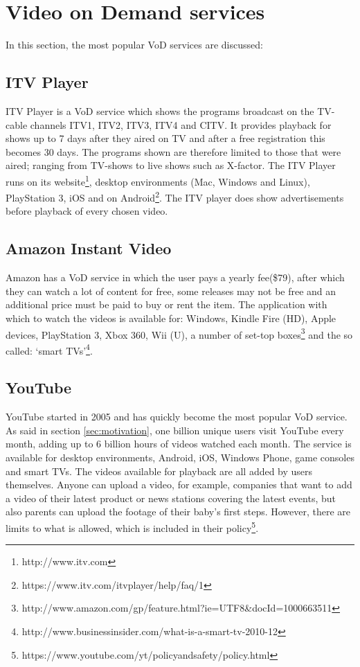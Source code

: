 \section{Video on Demand services}
\label{sec:vodserv}
In this section, the most popular VoD services are discussed:

\subsection{ITV Player}
ITV Player is a VoD service which shows the programs broadcast on the TV-cable channels ITV1, ITV2, ITV3, ITV4 and CITV. It provides playback for shows up to 7 days after they aired on TV and after a free registration this becomes 30 days. The programs shown are therefore limited to those that were aired; ranging from TV-shows to live shows such as X-factor. The ITV Player runs on its website\footnote{http://www.itv.com}, desktop environments (Mac, Windows and Linux), PlayStation 3, iOS and on Android\footnote{https://www.itv.com/itvplayer/help/faq/1}. The ITV player does show advertisements before playback of every chosen video.

\subsection{Amazon Instant Video}
Amazon has a VoD service in which the user pays a yearly fee(\$79), after which they can watch a lot of content for free, some releases may not be free and an additional price must be paid to buy or rent the item. The application with which to watch the videos is available for: Windows, Kindle Fire (HD), Apple devices, PlayStation 3, Xbox 360, Wii (U), a number of set-top boxes\footnote{http://www.amazon.com/gp/feature.html?ie=UTF8\&docId=1000663511} and the so called: `smart TVs'\footnote{http://www.businessinsider.com/what-is-a-smart-tv-2010-12}.

\subsection{YouTube}
YouTube started in 2005 and has quickly become the most popular VoD service. As said in section \ref{sec:motivation}, one billion unique users visit YouTube every month, adding up to 6 billion hours of videos watched each month. The service is available for desktop environments, Android, iOS, Windows Phone, game consoles and smart TVs. The videos available for playback are all added by users themselves. Anyone can upload a video, for example, companies that want to add a video of their latest product or news stations covering the latest events, but also parents can upload the footage of their baby's first steps. However, there are limits to what is allowed, which is included in their policy\footnote{https://www.youtube.com/yt/policyandsafety/policy.html}.

